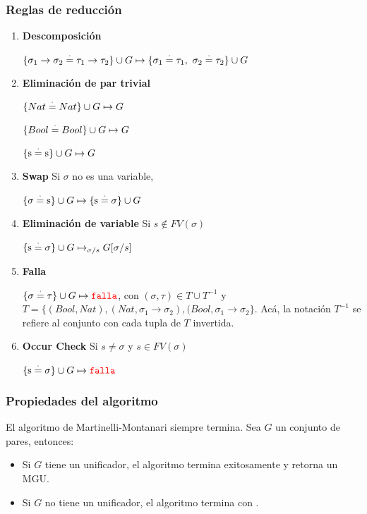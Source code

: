\subsubsection{Reglas de reducción}

\begin{enumerate}
	\item \textbf{Descomposición}
	
	$\{\sigma_1\to\sigma_2 \overset{\cdot}{=}\tau_1\to\tau_2\}\cup G\mapsto \{\sigma_1\overset{\cdot}{=}\tau_1,~\sigma_2 \overset{\cdot}{=}\tau_2\}\cup G$
	\item \textbf{Eliminación de par trivial}
	
	$\{Nat \overset{\cdot}{=} Nat\}\cup G\mapsto G$
	
	$\{ Bool \overset{\cdot}{=} Bool\}\cup G\mapsto G$
	
	$\{\text{s} \overset{\cdot}{=}\text{s}\}\cup G\mapsto G$
	\item \textbf{Swap} Si $\sigma$ no es una variable,
	
	$\{\sigma \overset{\cdot}{=}\text{s}\}\cup G\mapsto \{\text{s}\overset{\cdot}{=}\sigma\}\cup G$
	
	\item \textbf{Eliminación de variable} Si $s\notin FV(\sigma)$
	
	$\{\text{s}\overset{\cdot}{=}\sigma\}\cup G\mapsto_{\sigma/s} G[\sigma/s]$
	
	\item \textbf{Falla}
	
	$\{\sigma\overset{\cdot}{=}\tau\}\cup G\mapsto {\color{red}\texttt{falla}}$, con $(\sigma,\tau)\in T\cup T^{-1}$ y $T =\{( Bool,Nat), (Nat, \sigma_1\to\sigma_2), ( Bool, \sigma_1\to\sigma_2\}$. Acá, la notación $T^{-1}$ se refiere al conjunto con cada tupla de $T$ invertida.
	
	\item \textbf{Occur Check} Si $s\neq\sigma$ y $s\in FV(\sigma)$
	
	$\{\text{s}\overset{\cdot}{=}\sigma\}\cup G\mapsto {\color{red}\texttt{falla}}$
\end{enumerate}

\subsubsection{Propiedades del algoritmo}
El algoritmo de Martinelli-Montanari siempre termina. Sea $G$ un conjunto de pares, entonces:
\begin{itemize}
	\item Si $G$ tiene un unificador, el algoritmo termina exitosamente y retorna un MGU.
	\item Si $G$ no tiene un unificador, el algoritmo termina con .
\end{itemize}

